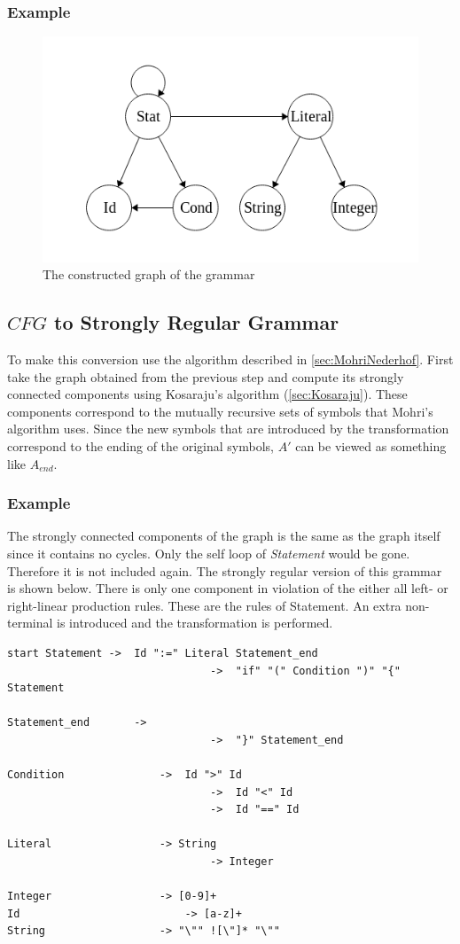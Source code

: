	\subsubsection{Example}
	\begin{figure}[H]
		\centering
		\includegraphics[scale=0.6, keepaspectratio]{Figures/grammarGraphChap2.png}
		\decoRule
	 	\caption[Graph of the example grammar]{The constructed graph of the grammar}
	 	\label{fig:chap2:graphOfExample}
	\end{figure}
	
	\subsection{$CFG$ to Strongly Regular Grammar}
	To make this conversion use the algorithm described in \ref{sec:MohriNederhof}. First take the graph obtained from the previous step and compute its strongly connected components using Kosaraju's algorithm (\ref{sec:Kosaraju}). These components correspond to the mutually recursive sets of symbols that Mohri's algorithm uses. Since the new symbols that are introduced by the transformation correspond to the ending of the original symbols, $A'$ can be viewed as something like $A_{end}$.
	\subsubsection{Example}
	The strongly connected components of the graph is the same as the graph itself since it contains no cycles. Only the self loop of \textit{Statement} would be gone. Therefore it is not included again. The strongly regular version of this grammar is shown below. There is only one component in violation of the either all left- or right-linear production rules. These are the rules of Statement. An extra non-terminal is introduced and the transformation is performed.
\begin{lstlisting}[language=RascalGrammar]
start Statement	->	Id ":=" Literal Statement_end
								->	"if" "(" Condition ")" "{" Statement

Statement_end		-> 
								->	"}" Statement_end

Condition				->	Id ">" Id
			 					->	Id "<" Id
								->	Id "==" Id

Literal					-> String
								-> Integer

Integer					-> [0-9]+
Id							-> [a-z]+
String					-> "\"" ![\"]* "\""
\end{lstlisting}	
	
